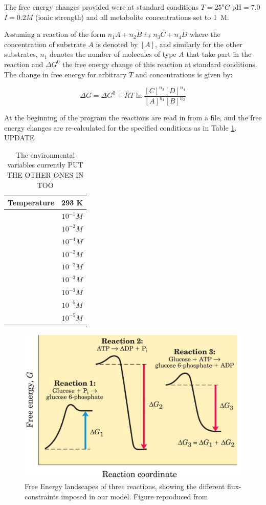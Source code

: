 \documentclass[a4paper,12pt]{article}
\begin{document}
	The free energy changes provided were at standard conditions $T=25  ^o C$ pH$=7.0$ $I=0.2 M$ (ionic strength) and all metabolite concentrations set to 1~M.
	
	Assuming a reaction of the form $n_1A + n_2B \leftrightarrows n_3C + n_4D$ where the concentration of substrate $A$ is denoted by $[A]$, and similarly for the other substrates, $n_1$ denotes the number of molecules of type $A$ that take part in the reaction and  $\Delta G^0$  the free energy change of this reaction at standard conditions. The change in free energy for arbitrary $T$ and concentrations is given by: 
	
	\begin{equation}\label{eq:freeechange}
		\Delta G = \Delta G^0 + R T \ln \frac{[C]^{n_3}[D]^{n_4}}{[A]^{n_1}[B]^{n_2}}
	\end{equation}
	
	At the beginning of the program the reactions are read in from a file, and the free energy changes are re-calculated for the specified conditions as in Table \ref{environmentTable}. UPDATE
	
	\begin{table}
		\centering
	\begin{tabular}{|c|c|}
		
		\hline Temperature & 293 K \\ 
		\hline [ATP] & $10^{-1} M$ \\ 
		\hline [ADP] & $10^{-2} M$ \\ 
		\hline [AMP] & $10^{-4} M$ \\ 
		\hline [NAD] & $10^{-2} M$ \\ 
		\hline [NADH] & $10^{-2} M$ \\ 
		\hline [Pi] &  $10^{-3} M$\\ 
		\hline [PPi] & $10^{-3} M$ \\ 
		\hline [CO$_2$] & $10^{-5} M$ \\ 
		\hline [NH$_3$] & $10^{-5} M$ \\ 

		\hline 
	\end{tabular} 
	\caption{The environmental variables currently PUT THE OTHER ONES IN TOO}
	\label{environmentTable}
	\end{table}


	\begin{figure}[htpb]
		\centering
		\includegraphics[width=0.6\linewidth]{freeEchangeFig.png}
		\caption{Free Energy landscapes of three reactions, showing the different flux-constraints imposed in our model. Figure reproduced from \cite{principlesofbio}}
		\label{fig:freeEchangeFig}
	\end{figure}
\end{document}
